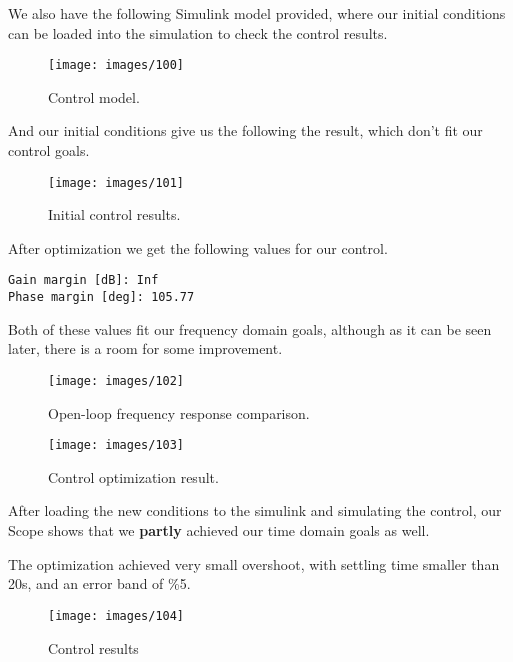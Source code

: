 \documentclass[12pt,a4paper]{article}
\begin{document}
We also have the following Simulink model provided, where our initial conditions can be loaded into the simulation to check the control results.


\begin{figure}[h]
	\caption{Control model.}
	\texttt{[image: images/100]}
	\centering
\end{figure}

\FloatBarrier

And our initial conditions give us the following the result, which don't fit our control goals.

\begin{figure}[h]
	\caption{Initial control results.}
	\texttt{[image: images/101]}
	\centering
\end{figure}

\FloatBarrier

After optimization we get the following values for our control.

\begin{verbatim}
Gain margin [dB]: Inf
Phase margin [deg]: 105.77
\end{verbatim}

Both of these values fit our frequency domain goals, although as it can be seen later, there is a room for some improvement.

\begin{figure}[h]
	\caption{Open-loop frequency response comparison.}
	\texttt{[image: images/102]}
	\centering
\end{figure}

\FloatBarrier

\begin{figure}[h]
	\caption{Control optimization result.}
	\texttt{[image: images/103]}
	\centering
\end{figure}

\FloatBarrier

After loading the new conditions to the simulink and simulating the control, our Scope shows that we \textbf{partly} achieved our time domain goals as well.

The optimization achieved very small overshoot, with settling time smaller than 20s, and an error band of \%5.

\begin{figure}[h]
	\caption{Control results}
	\texttt{[image: images/104]}
	\centering
\end{figure}

\FloatBarrier
\end{document}
